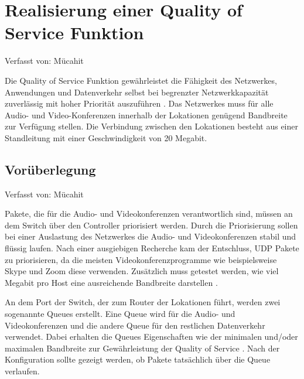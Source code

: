 \documentclass[fontsize=12pt,paper=a4,open=any,parskip=half,
  twoside=false,toc=listof,toc=bibliography,fleqn,leqno,
  captions=nooneline,captions=tableabove,british]{scrbook}
\begin{document}
\newpage
\section{Realisierung einer Quality of Service Funktion}
{\tiny Verfasst von: Mücahit\par}
Die Quality of Service Funktion gewährleistet die Fähigkeit des Netzwerkes, Anwendungen und Datenverkehr selbst bei begrenzter Netzwerkkapazität zuverlässig mit hoher Priorität auszuführen \cite{qosdef}. Das Netzwerkes muss für alle Audio- und Video-Konferenzen innerhalb der Lokationen genügend Bandbreite zur Verfügung stellen. Die Verbindung zwischen den Lokationen besteht aus einer Standleitung mit einer Geschwindigkeit von 20 Megabit.

\subsection{Vorüberlegung}
{\tiny Verfasst von: Mücahit\par}
Pakete, die für die Audio- und Videokonferenzen verantwortlich sind, müssen an dem Switch über den Controller priorisiert werden. Durch die Priorisierung sollen bei einer Auslastung des Netzwerkes die Audio- und Videokonferenzen stabil und flüssig laufen. Nach einer ausgiebigen Recherche kam der Entschluss, UDP Pakete zu priorisieren, da die meisten Videokonferenzprogramme wie beispielsweise Skype und Zoom diese verwenden. Zusätzlich muss getestet werden, wie viel Megabit pro Host eine ausreichende Bandbreite darstellen \cite{qosbenefits}.\par
An dem Port der Switch, der zum Router der Lokationen führt, werden zwei sogenannte Queues erstellt. Eine Queue wird für die Audio- und Videokonferenzen und die andere Queue für den restlichen Datenverkehr verwendet. Dabei erhalten die Queues Eigenschaften wie der minimalen und/oder maximalen Bandbreite zur Gewährleistung der Quality of Service \cite[952]{qosof}. Nach der Konfiguration sollte gezeigt werden, ob Pakete tatsächlich über die Queue verlaufen. 
\end{document}
